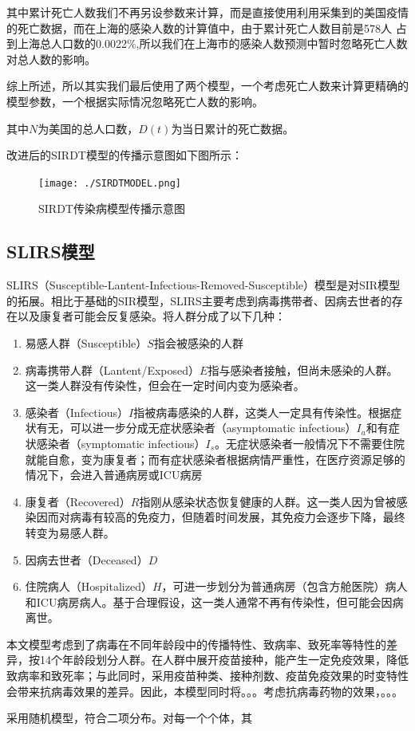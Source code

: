 \documentclass[bwprint]{gmcmthesis}
\numberwithin{figure}{section}
\begin{document}
\par 其中累计死亡人数我们不再另设参数来计算，而是直接使用利用采集到的美国疫情的死亡数据，而在上海的感染人数的计算值中，由于累计死亡人数目前是578人
占到上海总人口数的0.0022$\%$,所以我们在上海市的感染人数预测中暂时忽略死亡人数对总人数的影响。

\par 综上所述，所以其实我们最后使用了两个模型，一个考虑死亡人数来计算更精确的模型参数，一个根据实际情况忽略死亡人数的影响。

\par 其中$N$为美国的总人口数，$D\left( t \right)$为当日累计的死亡数据。

\par 改进后的SIRDT模型的传播示意图如下图所示：

\begin{figure}[!h]
    \centering
    \texttt{[image: ./SIRDTMODEL.png]}
    \caption{SIRDT传染病模型传播示意图}
    \label{fig1}
\end{figure}


\subsection{SLIRS模型}
SLIRS（Susceptible-Lantent-Infectious-Removed-Susceptible）模型是对SIR模型的拓展。相比于基础的SIR模型，SLIRS主要考虑到病毒携带者、因病去世者的存在以及康复者可能会反复感染。将人群分成了以下几种：
\begin{enumerate}
\item 易感人群（Susceptible）$S$指会被感染的人群
\item 病毒携带人群（Lantent/Exposed）$E$指与感染者接触，但尚未感染的人群。这一类人群没有传染性，但会在一定时间内变为感染者。
\item 感染者（Infectious）$I$指被病毒感染的人群，这类人一定具有传染性。根据症状有无，可以进一步分成无症状感染者（asymptomatic infectious）$I_a$和有症状感染者（symptomatic infectious）$I_s$。无症状感染者一般情况下不需要住院就能自愈，变为康复者；而有症状感染者根据病情严重性，在医疗资源足够的情况下，会进入普通病房或ICU病房
\item 康复者（Recovered）$R$指刚从感染状态恢复健康的人群。这一类人因为曾被感染因而对病毒有较高的免疫力，但随着时间发展，其免疫力会逐步下降，最终转变为易感人群。
\item 因病去世者（Deceased）$D$
\item 住院病人（Hospitalized）$H$，可进一步划分为普通病房（包含方舱医院）病人和ICU病房病人。基于合理假设，这一类人通常不再有传染性，但可能会因病离世。

\end{enumerate}
\par 本文模型考虑到了病毒在不同年龄段中的传播特性、致病率、致死率等特性的差异，按14个年龄段划分人群。在人群中展开疫苗接种，能产生一定免疫效果，降低致病率和致死率；与此同时，采用疫苗种类、接种剂数、疫苗免疫效果的时变特性会带来抗病毒效果的差异。因此，本模型同时将。。。考虑抗病毒药物的效果，。。。
\par 采用随机模型，符合二项分布。对每一个个体，其
\end{document}
